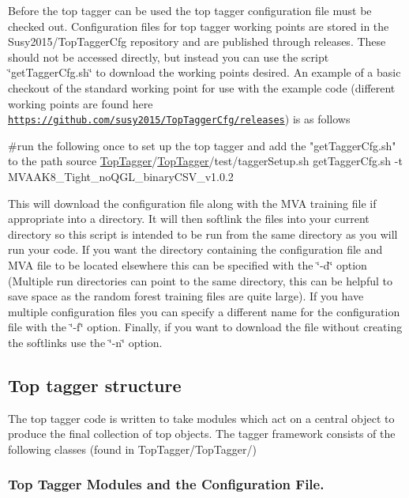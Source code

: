 Before the top tagger can be used the top tagger configuration file must be checked out. Configuration files for top tagger working points are stored in the Susy2015/\-Top\-Tagger\-Cfg repository and are published through releases. These should not be accessed directly, but instead you can use the script \char`\"{}get\-Tagger\-Cfg.\-sh\char`\"{} to download the working points desired. An example of a basic checkout of the standard working point for use with the example code (different working points are found here \href{https://github.com/susy2015/TopTaggerCfg/releases}{\tt https\-://github.\-com/susy2015/\-Top\-Tagger\-Cfg/releases}) is as follows


\begin{DoxyCode}
\textcolor{preprocessor}{#run the following once to set up the top tagger and add the "getTaggerCfg.sh" to the path}
\textcolor{preprocessor}{}source \hyperlink{classTopTagger}{TopTagger}/\hyperlink{classTopTagger}{TopTagger}/test/taggerSetup.sh
getTaggerCfg.sh -t MVAAK8\_Tight\_noQGL\_binaryCSV\_v1.0.2
\end{DoxyCode}


This will download the configuration file along with the M\-V\-A training file if appropriate into a directory. It will then softlink the files into your current directory so this script is intended to be run from the same directory as you will run your code. If you want the directory containing the configuration file and M\-V\-A file to be located elsewhere this can be specified with the \char`\"{}-\/d\char`\"{} option (Multiple run directories can point to the same directory, this can be helpful to save space as the random forest training files are quite large). If you have multiple configuration files you can specify a different name for the configuration file with the \char`\"{}-\/f\char`\"{} option. Finally, if you want to download the file without creating the softlinks use the \char`\"{}-\/n\char`\"{} option.

\subsection*{Top tagger structure}

The top tagger code is written to take modules which act on a central object to produce the final collection of top objects. The tagger framework consists of the following classes (found in Top\-Tagger/\-Top\-Tagger/)

\subsubsection*{Top Tagger Modules and the Configuration File.}


